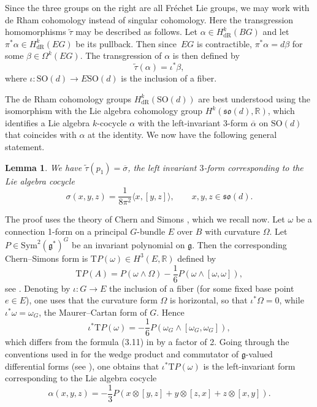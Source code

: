 \documentclass[10pt,a4paper]{amsart}
\numberwithin{equation}{section}
\newtheorem{Lemma}[Theorem]{Lemma}
\newcommand{\R}{\mathbb{R}}
\newcommand{\SO}{\mathrm{SO}}
\begin{document}
Since the three groups on the right are all Fr\'echet Lie groups, we may work with de Rham cohomology instead of singular cohomology.
Here the transgression homomorphisms $\tilde{\tau}$ may be described as follows.
Let $\alpha \in H^k_{\mathrm{dR}}(BG)$ and let $\pi^*\alpha \in H^k_{\mathrm{dR}}(EG)$ be its pullback.
Then since~$EG$ is contractible, $\pi^* \alpha = d \beta$ for some $\beta \in \Omega^k(EG)$.
The transgression of $\alpha$ is then defined by
\begin{equation}
\label{DefTransgressionTilde}
	\tilde{\tau}(\alpha) = \iota^*\beta,
\end{equation}
where $\iota \colon \SO(d) \to E\SO(d)$ is the inclusion of a fiber.

The de Rham cohomology groups $H^k_{\mathrm{dR}}(\SO(d))$ are best understood using the isomorphism with the Lie algebra cohomology group $H^k(\mathfrak{so}(d), \R)$, which identifies a Lie algebra $k$-cocycle $\alpha$ with the left-invariant 3-form $\overline{\alpha}$ on $\SO(d)$ that coincides with $\alpha$ at the identity.
We now have the following general statement.

\begin{Lemma}
\label{SecondLemmaA}
We have $\tilde{\tau}(p_1) = \overline{\sigma}$, the left invariant $3$-form corresponding to the Lie algebra cocycle
\begin{equation*}
 \sigma(x, y, z) = \frac{1}{8 \pi^2} \langle x, [y, z] \rangle, \qquad x, y, z \in \mathfrak{so}(d).	
\end{equation*}
\end{Lemma}

The proof uses the theory of Chern and Simons \cite{ChernSimons}, which we recall now.
Let $\omega$ be a connection 1-form on a principal $G$-bundle $E$ over $B$ with curvature $\Omega$.
Let $P \in \mathrm{Sym}^2(\mathfrak{g}^*)^G$ be an invariant polynomial on $\mathfrak{g}$.
Then the corresponding Chern--Simons form is $\mathrm{T}P(\omega) \in H^3(E, \R)$ defined by
\begin{equation*}
 \mathrm{T}P(A) = P(\omega \wedge \Omega) - \frac{1}{6} P(\omega \wedge [\omega, \omega]),
\end{equation*}
see \cite[formula~(3.5)]{ChernSimons}.
Denoting by $\iota \colon G \to E$ the inclusion of a fiber (for some fixed base point~$e \in E$), one uses that the curvature form $\Omega$ is horizontal, so that $\iota^*\Omega = 0$, while $\iota^*\omega = \omega_G$, the Maurer--Cartan form of $G$.
Hence
\begin{equation*}
\iota^*\mathrm{T}P(\omega) = -\frac{1}{6} P(\omega_G \wedge [\omega_G, \omega_G]),
\end{equation*}
which differs from the formula (3.11) in \cite{ChernSimons} by a factor of 2.
Going through the conventions used in \cite{ChernSimons} for the wedge product and commutator of $\mathfrak{g}$-valued differential forms (see \cite[p.~50]{ChernSimons}), one obtains that $\iota^* \mathrm{T}P(\omega)$ is the left-invariant form corresponding to the Lie algebra cocycle
\begin{equation}
\label{DefinitionAlpha}
 \alpha(x, y, z) =	- \frac{1}{3} P(x \otimes [y, z] + y \otimes [z, x] + z \otimes [x, y]).
\end{equation}
\end{document}
